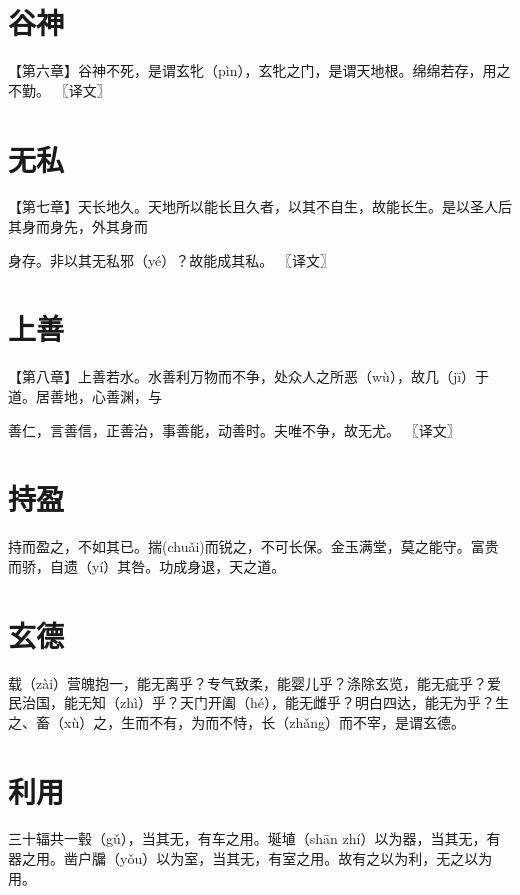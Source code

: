 \documentclass[a4paper,12pt,UTF8,twoside]{ctexbook}
\begin{document}
	
	
	
	\chapter{谷神}
	【第六章】谷神不死，是谓玄牝（pìn），玄牝之门，是谓天地根。绵绵若存，用之不勤。 〖译文〗
	
	
	
	
	
	\chapter{无私}
	【第七章】天长地久。天地所以能长且久者，以其不自生，故能长生。是以圣人后其身而身先，外其身而
	
	身存。非以其无私邪（yé）？故能成其私。 〖译文〗
	
	
	
	
	\chapter{上善}
	【第八章】上善若水。水善利万物而不争，处众人之所恶（wù），故几（jī）于道。居善地，心善渊，与
	
	善仁，言善信，正善治，事善能，动善时。夫唯不争，故无尤。 〖译文〗
	
	
	
	
	\chapter{持盈}
	
	持而盈之，不如其已。揣(chuǎi)而锐之，不可长保。金玉满堂，莫之能守。富贵而骄，自遗（yí）其咎。功成身退，天之道。	

	\chapter{玄德}
		
	载（zài）营魄抱一，能无离乎？专气致柔，能婴儿乎？涤除玄览，能无疵乎？爱民治国，能无知（zhì）乎？天门开阖（hé），能无雌乎？明白四达，能无为乎？生之、畜（xù）之，生而不有，为而不恃，长（zhǎng）而不宰，是谓玄德。
	
	\chapter{利用}
	
	三十辐共一毂（gǔ），当其无，有车之用。埏埴（shān zhí）以为器，当其无，有器之用。凿户牖（yǒu）以为室，当其无，有室之用。故有之以为利，无之以为用。
	
\end{document}
